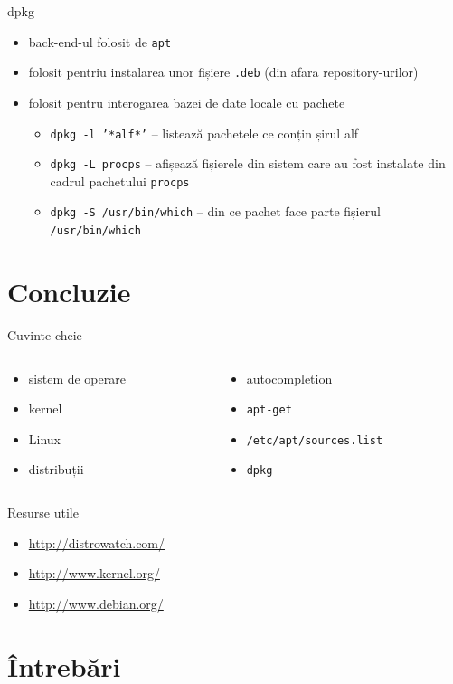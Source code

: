 \documentclass{curs}
\begin{document}
\begin{frame}{dpkg}
  \begin{itemize}
    \item back-end-ul folosit de \texttt{apt}
    \item folosit pentriu instalarea unor fișiere \texttt{.deb} (din afara
      repository-urilor)
    \item folosit pentru interogarea bazei de date locale cu pachete
      \begin{itemize}
        \item \texttt{dpkg -l '*alf*'} -- listează pachetele ce conțin șirul
          alf
        \item \texttt{dpkg -L procps} -- afișează fișierele din sistem care au
          fost instalate din cadrul pachetului \texttt{procps}
        \item \texttt{dpkg -S /usr/bin/which} -- din ce pachet face parte
          fișierul \texttt{/usr/bin/which}
      \end{itemize}
  \end{itemize}
\end{frame}


\section{Concluzie}

\begin{frame}{Cuvinte cheie}
  \begin{columns}
    \begin{column}[l]{0.5\textwidth}
      \begin{itemize}
        \item sistem de operare
        \item kernel
        \item Linux
        \item distribuții
      \end{itemize}
    \end{column}
    \begin{column}[l]{0.5\textwidth}
      \begin{itemize}
        \item autocompletion
        \item \texttt{apt-get}
        \item \texttt{/etc/apt/sources.list}
        \item \texttt{dpkg}
      \end{itemize}
    \end{column}
  \end{columns}
\end{frame}

\begin{frame}{Resurse utile}
  \begin{itemize}
    \item \url{http://distrowatch.com/}
    \item \url{http://www.kernel.org/}
    \item \url{http://www.debian.org/}
  \end{itemize}
\end{frame}


\section{Întrebări}
\end{document}
